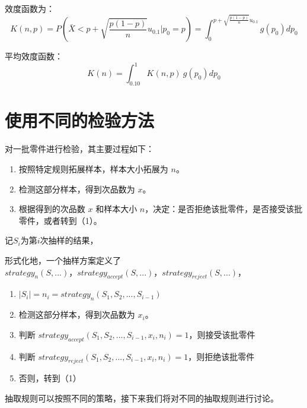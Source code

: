 \documentclass{article}
\begin{document}
	效度函数为：
	\[
	K(n,p) = P(\bar X < p + \sqrt{\frac{p(1-p)}{n}}u_{0.1} | p_0 = p)
	= \int_{0}^{p + \sqrt{\frac{p(1-p)}{n}}u_{0.1}} g(p_0) dp_0
	\]
	
	平均效度函数：
	\[
	K(n) = \int_{0.10}^{1} K(n, p)\ g(p_0) dp_0
	\]
	
	
	\section*{使用不同的检验方法}
	对一批零件进行检验，其主要过程如下：
	
	\begin{enumerate}
		\item 按照特定规则拓展样本，样本大小拓展为 $n$。
		\item 检测这部分样本，得到次品数为 $x$。
		\item 根据得到的次品数 $x$ 和样本大小 $n$，决定：是否拒绝该批零件，是否接受该批零件，或者转到（1）。
	\end{enumerate}
	
	记$S_i$为第$i$次抽样的结果，
	
	形式化地，一个抽样方案定义了$strategy_n(S,...)，strategy_{accept}(S,...)，strategy_{reject}(S,...)$，
	\begin{enumerate}
		\item $|S_i| = n_i = strategy_n(S_1,S_2,...,S_{i-1})$
		\item 检测这部分样本，得到次品数为 $x_i$。
		\item 判断 $strategy_{accept}(S_1,S_2,...,S_{i-1},x_i,n_i) = 1$，则接受该批零件
		\item 判断 $strategy_{reject}(S_1,S_2,...,S_{i-1},x_i,n_i) = 1$，则拒绝该批零件
		\item 否则，转到（1）
	\end{enumerate}
	
	抽取规则可以按照不同的策略，接下来我们将对不同的抽取规则进行讨论。
	
	
	
\end{document}
